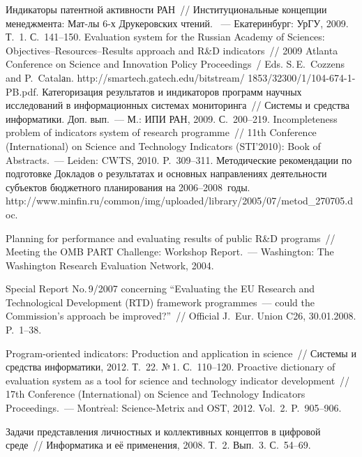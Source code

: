 \begin{multicols}{2}
{{\begin{thebibliography}{99}
 Индикаторы патентной активности РАН~// 
Институциональные концепции менеджмента: Мат-лы 6-х Друкеровских чтений. ~--- 
Екатеринбург: УрГУ, 2009. Т.~1. С.~141--150.
Evaluation system for the Russian Academy of Sciences: 
Objectives--Resources--Results approach and R\&D indicators~//
2009 Atlanta Conference on Science and Innovation Policy Proceedings~/ Eds. S.\,E.~Cozzens 
and P.~Catalаn. {\sf http://smartech.gatech.edu/bitstream/ 1853/32300/1/104-674-1-PB.pdf}.
 Категоризация результатов и индикаторов программ научных исследований в 
информационных системах мониторинга~// Системы и средства информатики. Доп. вып.~--- М.: ИПИ 
РАН, 2009. С.~200--219.
 Incompleteness problem of indicators system of research programme~// 11th 
Conference (International) on Science and Technology Indicators (STI'2010): Book of Abstracts.~--- Leiden: 
CWTS, 2010. P.~309--311.
Методические рекомендации по подготовке Докладов о результатах и основных направлениях 
деятельности субъектов бюджетного планирования на 2006--2008~годы. {\sf 
http://www.minfin.ru/common/\linebreak img/uploaded/library/2005/07/metod\_270705.doc}.

Planning for performance and evaluating results of public R\&D programs~// Meeting the OMB PART 
Challenge: Workshop Report.~--- Washington: The Washington Research Evaluation Network, 2004.

Special Report No.\,9/2007 concerning ``Evaluating the EU Research and Technological Development (RTD) 
framework programmes~--- could the Commission's approach be improved?''~// Official J.~Eur. Union 
C26, 30.01.2008. P.~1--38.

 Program-oriented indicators: Production and application in science~// Системы и 
средства информатики, 2012. Т.~22. №\,1. С.~110--120.
 Proactive dictionary of evaluation system as a tool for science and technology 
indicator development~// 17th Conference (International) on Science and Technology Indicators 
Proceedings.~--- Montr$\acute{\mbox{e}}$al: Science-Metrix and OST, 2012. Vol.~2. P.~905--906.

 Задачи представления личностных и коллективных 
концептов в цифровой среде~// Информатика и её применения, 2008. Т.~2. Вып.~3. С.~54--69.


\end{thebibliography}}}
\end{multicols}
